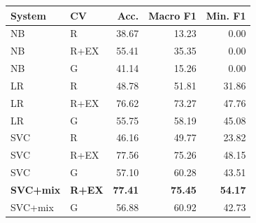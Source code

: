 \begin{tabular}{@{}llrrr@{}}
\toprule
System & CV & Acc. & Macro F1 & Min. F1 \\
\midrule
NB & R & 38.67 & 13.23 & 0.00 \\
NB & R+EX & 55.41 & 35.35 & 0.00 \\
NB & G & 41.14 & 15.26 & 0.00 \\
LR & R & 48.78 & 51.81 & 31.86 \\
LR & R+EX & 76.62 & 73.27 & 47.76 \\
LR & G & 55.75 & 58.19 & 45.08 \\
SVC & R & 46.16 & 49.77 & 23.82 \\
SVC & R+EX & 77.56 & 75.26 & 48.15 \\
SVC & G & 57.10 & 60.28 & 43.51 \\
\textbf{SVC+mix} & \textbf{R+EX} & \textbf{77.41} & \textbf{75.45} & \textbf{54.17} \\
SVC+mix & G & 56.88 & 60.92 & 42.73 \\
\bottomrule
\end{tabular}
